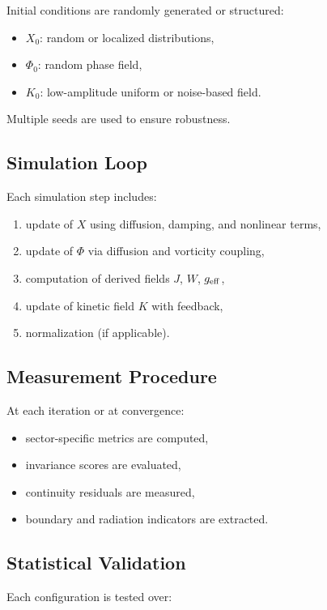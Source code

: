 \documentclass[11pt]{article}
\begin{document}
Initial conditions are randomly generated or structured:

\begin{itemize}
\item $X_0$: random or localized distributions,
\item $\Phi_0$: random phase field,
\item $K_0$: low-amplitude uniform or noise-based field.
\end{itemize}

Multiple seeds are used to ensure robustness.

\subsection{Simulation Loop}

Each simulation step includes:

\begin{enumerate}
\item update of $X$ using diffusion, damping, and nonlinear terms,
\item update of $\Phi$ via diffusion and vorticity coupling,
\item computation of derived fields $J$, $W$, $g_{\rm eff}$,
\item update of kinetic field $K$ with feedback,
\item normalization (if applicable).
\end{enumerate}

\subsection{Measurement Procedure}

At each iteration or at convergence:

\begin{itemize}
\item sector-specific metrics are computed,
\item invariance scores are evaluated,
\item continuity residuals are measured,
\item boundary and radiation indicators are extracted.
\end{itemize}

\subsection{Statistical Validation}

Each configuration is tested over:
\end{document}
